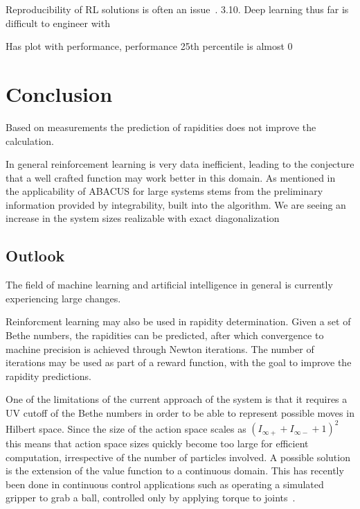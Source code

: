 \documentclass[11pt, a4paper]{report} %
\begin{document}
Reproducibility of RL solutions is often an issue~\cite{1709.06560}.
3.10. Deep learning thus far is difficult to engineer with \cite{marcus18_deep_learn}

Has plot with performance, performance 25th percentile is almost 0\cite{houthooft16_vime}



\cite{brundage18_malic_use_artif_intel}


\cite{marcus18_deep_learn}




\section{Conclusion}

Based on measurements the prediction of rapidities does not improve the calculation.

In general reinforcement learning is very data inefficient, leading to the conjecture that a well crafted function may work better in this domain.
As mentioned in~\cite{Caux2009} the applicability of ABACUS for large systems stems from the preliminary information provided by integrability, built into the algorithm.
We are seeing an increase in the system sizes realizable with exact diagonalization \cite{wietek18_sublat_codin_algor_distr_memor}

\subsection{Outlook}

The field of machine learning and artificial intelligence in general is currently experiencing large changes.

Reinforcment learning may also be used in rapidity determination.
Given a set of Bethe numbers, the rapidities can be predicted, after which convergence to machine precision is achieved through Newton iterations.
The number of iterations may be used as part of a reward function, with the goal to improve the rapidity predictions.

One of the limitations of the current approach of the system is that it requires a UV cutoff of the Bethe numbers in order to be able to represent possible moves in Hilbert space.
Since the size of the action space scales as \((I_{\infty+} + I_{\infty-} + 1)^2\) this means that action space sizes quickly become too large for efficient computation, irrespective of the number of particles involved.
A possible solution is the extension of the value function to a continuous domain.
This has recently been done in continuous control applications such as operating a simulated gripper to grab a ball, controlled only by applying torque to joints~\cite{lillicrap15_contin_contr_with_deep_reinf_learn}.
\end{document}
